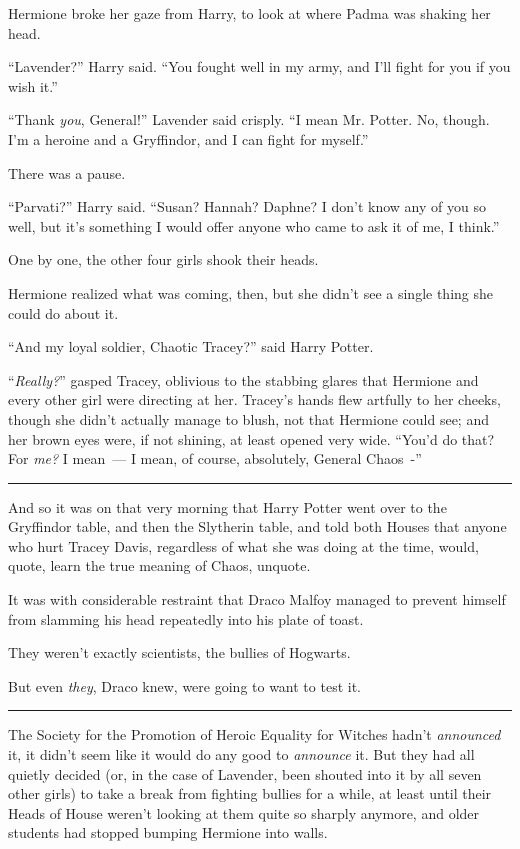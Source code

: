 Hermione broke her gaze from Harry, to look at where Padma was shaking her head.

``Lavender?'' Harry said. ``You fought well in my army, and I'll fight for you if you wish it.''

``Thank \emph{you}, General!'' Lavender said crisply. ``I mean Mr. Potter. No, though. I'm a heroine and a Gryffindor, and I can fight for myself.''

There was a pause.

``Parvati?'' Harry said. ``Susan? Hannah? Daphne? I don't know any of you so well, but it's something I would offer anyone who came to ask it of me, I think.''

One by one, the other four girls shook their heads.

Hermione realized what was coming, then, but she didn't see a single thing she could do about it.

``And my loyal soldier, Chaotic Tracey?'' said Harry Potter.

``\emph{Really?}'' gasped Tracey, oblivious to the stabbing glares that Hermione and every other girl were directing at her. Tracey's hands flew artfully to her cheeks, though she didn't actually manage to blush, not that Hermione could see; and her brown eyes were, if not shining, at least opened very wide. ``You'd do that? For \emph{me?} I mean~--- I mean, of course, absolutely, General Chaos~-''

\begin{center}\rule{3in}{0.4pt}\end{center}

And so it was on that very morning that Harry Potter went over to the Gryffindor table, and then the Slytherin table, and told both Houses that anyone who hurt Tracey Davis, regardless of what she was doing at the time, would, quote, learn the true meaning of Chaos, unquote.

It was with considerable restraint that Draco Malfoy managed to prevent himself from slamming his head repeatedly into his plate of toast.

They weren't exactly scientists, the bullies of Hogwarts.

But even \emph{they}, Draco knew, were going to want to test it.

\begin{center}\rule{3in}{0.4pt}\end{center}

The Society for the Promotion of Heroic Equality for Witches hadn't \emph{announced} it, it didn't seem like it would do any good to \emph{announce} it. But they had all quietly decided (or, in the case of Lavender, been shouted into it by all seven other girls) to take a break from fighting bullies for a while, at least until their Heads of House weren't looking at them quite so sharply anymore, and older students had stopped bumping Hermione into walls.

